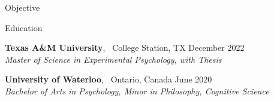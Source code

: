 \documentclass{resume} %
\begin{document}
    

\begin{rSection}{Objective}

	
	
\end{rSection}


\begin{rSection}{Education}
    
    {\textbf{Texas A\&M University}, \ College Station, TX \hfill {December 
    2022}
    \\ \textit {Master of Science in Experimental Psychology, with Thesis}}

    {\textbf{University of Waterloo}, \ Ontario, Canada \hfill 
    {June 2020}
    \\ \textit {Bachelor of Arts in Psychology, Minor in Philosophy, Cognitive 
    Science}}

\end{rSection}

\end{document}
